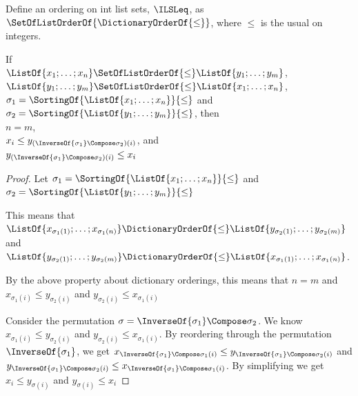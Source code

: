 \documentclass[acmsmall,screen]{acmart}
\begin{document}
\begin{definition}
  Define an ordering on int list sets, $\ILSLeq$, as
  $\SetOfListOrderOf{\DictionaryOrderOf{\leq}}$, where $\leq$ is the usual on
  integers.
\end{definition}

\begin{mylemma}
  \label{lem:spec-set-list-perm}
  If \\
  $\ListOf{x_1;\ldots;x_n} \SetOfListOrderOf{\leq} \ListOf{y_1;\ldots;y_m}$,\\
  $\ListOf{y_1;\ldots;y_m} \SetOfListOrderOf{\leq} \ListOf{x_1;\ldots;x_n}$,\\
  $\sigma_1 = \SortingOf{\ListOf{x_1;\ldots;x_n}}{\leq}$ and\\
  $\sigma_2 = \SortingOf{\ListOf{y_1;\ldots;y_m}}{\leq}$, then\\
  $n = m$,\\
  $x_i \leq y_{(\InverseOf{\sigma_1} \Compose \sigma_2)(i)}$, and\\
  $y_{(\InverseOf{\sigma_1} \Compose \sigma_2)(i)} \leq x_i$
\end{mylemma}
\begin{proof}
    Let $\sigma_1 = \SortingOf{\ListOf{x_1;\ldots;x_n}}{\leq}$ and
    $\sigma_2 = \SortingOf{\ListOf{y_1;\ldots;y_m}}{\leq}$
    
    This means that
    $\ListOf{x_{\sigma_1(1)};\ldots;x_{\sigma_1(n)}} \DictionaryOrderOf{\leq}
    \ListOf{y_{\sigma_2(1)};\ldots;y_{\sigma_2(m)}}$ and
    $\ListOf{y_{\sigma_2(1)};\ldots;y_{\sigma_2(m)}} \DictionaryOrderOf{\leq}
    \ListOf{x_{\sigma_1(1)};\ldots;x_{\sigma_1(n)}}$.

    By the above property about dictionary orderings, this means that $n=m$ and
    $x_{\sigma_1(i)} \leq y_{\sigma_2(i)}$ and $y_{\sigma_2(i)} \leq
    x_{\sigma_1(i)}$

    Consider the permutation $\sigma = \InverseOf{\sigma_1} \Compose \sigma_2$.
    We know $x_{\sigma_1(i)} \leq y_{\sigma_2(i)}$ and $y_{\sigma_2(i)} \leq
    x_{\sigma_1(i)}$.  By reordering through the permutation
    $\InverseOf{\sigma_1}$, we get $x_{\InverseOf{\sigma_1} \Compose \sigma_1(i)}
    \leq y_{\InverseOf{\sigma_1} \Compose \sigma_2(i)}$ and
    $y_{\InverseOf{\sigma_1} \Compose \sigma_2(i)} \leq 
    x_{\InverseOf{\sigma_1} \Compose \sigma_1(i)}$.  By simplifying we get
    $x_i
    \leq y_{\sigma(i)}$ and
    $y_{\sigma(i)} \leq x_{i}$
\end{proof}
\end{document}
